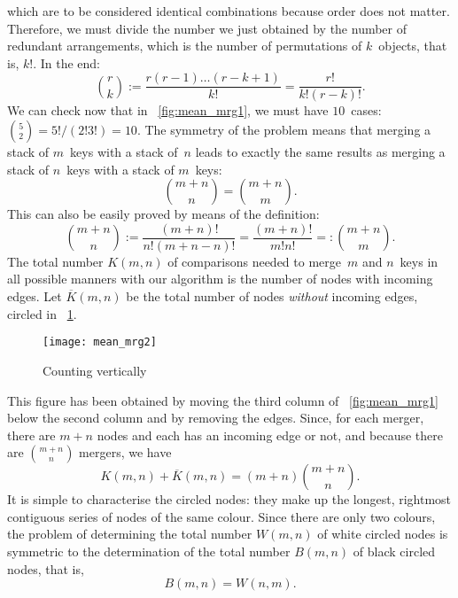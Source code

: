 which are to be considered identical combinations because order does
not matter. Therefore, we must divide the number we just obtained by
the number of redundant arrangements, which is the number of
permutations of \(k\)~objects, that is, \(k!\). In the end:
\begin{equation*}
\binom{r}{k} := \frac{r(r-1)\ldots(r-k+1)}{k!} =
\frac{r!}{k!(r-k)!}.
\end{equation*}
We can check now that in \fig~\vref{fig:mean_mrg1}, we must have
\(10\)~cases: \(\binom{5}{2} = 5!/(2!3!) = 10\). The symmetry of the
problem means that merging a stack of \(m\)~keys with a stack of~\(n\)
leads to exactly the same results as merging a stack of \(n\)~keys
with a stack of \(m\)~keys:
\begin{equation*}
\binom{m+n}{n} = \binom{m+n}{m}.
\end{equation*}
This can also be easily proved by means of the definition:
\begin{equation*}
\binom{m+n}{n} := \frac{(m+n)!}{n!(m+n-n)!} =
\frac{(m+n)!}{m!n!} =: \binom{m+n}{m}.
\end{equation*}
The total number \(K(m,n)\) of comparisons needed to merge~\(m\) and
\(n\)~keys in all possible manners with our algorithm is the number of
nodes with incoming edges. Let \(\overline{K}(m,n)\) be the total
number of nodes \emph{without} incoming edges, circled in
\fig~\ref{fig:mean_mrg2}.
\begin{figure}[b]
\centering
\texttt{[image: mean\_mrg2]}
\caption{Counting vertically}
\label{fig:mean_mrg2}
\end{figure}
This figure has been obtained by moving the third column of
\fig~\vref{fig:mean_mrg1} below the second column and by removing the
edges. Since, for each merger, there are \(m+n\) nodes and each has an
incoming edge or not, and because there are \(\binom{m+n}{n}\)
mergers, we have
\begin{equation}
K(m,n) + \overline{K}(m,n) = (m + n) \binom{m+n}{n}.
\label{eq:KoverK}
\end{equation}
It is simple to characterise the circled nodes: they make up the
longest, rightmost contiguous series of nodes of the same
colour. Since there are only two colours, the problem of determining
the total number \(W(m,n)\) of white circled nodes is symmetric to the
determination of the total number \(B(m,n)\) of black circled nodes,
that is,
\begin{equation*}
B(m,n) = W(n,m).
\end{equation*}
